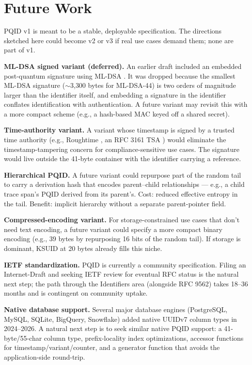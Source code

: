 \section{Future Work}
\label{sec:future}

PQID v1 is meant to be a stable, deployable specification. The directions sketched here could become v2 or v3 if real use cases demand them; none are part of v1.

\textbf{ML-DSA signed variant (deferred).} An earlier draft included an embedded post-quantum signature using ML-DSA \citep{fips204}. It was dropped because the smallest ML-DSA signature ($\sim$3{,}300 bytes for ML-DSA-44) is two orders of magnitude larger than the identifier itself, and embedding a signature in the identifier conflates identification with authentication. A future variant  may revisit this with a more compact scheme (e.g., a hash-based MAC keyed off a shared secret).

\textbf{Time-authority variant.} A variant whose timestamp is signed by a trusted time authority (e.g., Roughtime \citep{roughtime}, an RFC 3161 TSA \citep{rfc3161}) would eliminate the timestamp-tampering concern for compliance-sensitive use cases. The signature would live outside the 41-byte container with the identifier carrying a reference.

\textbf{Hierarchical PQID.} A future variant could repurpose part of the random tail to carry a derivation hash that encodes parent--child relationships --- e.g., a child trace span's PQID derived from its parent's. Cost: reduced effective entropy in the tail. Benefit: implicit hierarchy without a separate parent-pointer field.

\textbf{Compressed-encoding variant.} For storage-constrained use cases that don't need text encoding, a future variant could specify a more compact binary encoding (e.g., 39 bytes by repurposing 16 bits of the random tail). If storage is dominant, KSUID at 20 bytes already fills this niche.

\textbf{IETF standardization.} PQID is currently a community specification. Filing an Internet-Draft and seeking IETF review for eventual RFC status is the natural next step; the path through the Identifiers area (alongside RFC 9562) takes 18--36 months and is contingent on community uptake.

\textbf{Native database support.} Several major database engines (PostgreSQL, MySQL, SQLite, BigQuery, Snowflake) added native UUIDv7 column types in 2024--2026. A natural next step is to seek similar native PQID support: a 41-byte/55-char column type, prefix-locality index optimizations, accessor functions for timestamp/variant/counter, and a generator function that avoids the application-side round-trip.

